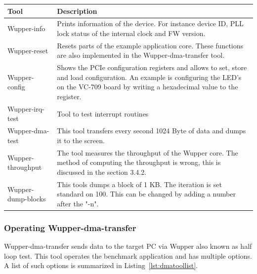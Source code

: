 \begin{center}
	\begin{tabular}{ | l || p{10cm} |}
		\hline
		Tool & Description                       \\ \hline
		
		Wupper-info
		&  Prints information of the device. For instance device ID, PLL lock status of the internal clock and FW version.
		\\ \hline
		
		Wupper-reset
		&  Resets parts of the example application core. These functions are also implemented in the Wupper-dma-transfer tool.
		\\ \hline
		
		
		Wupper-config
		& Shows the PCIe configuration registers and allows to set, store and load configuration. An example is configuring the LED's on the VC-709 board by writing a hexadecimal value to the register.
		\\ \hline
		Wupper-irq-test
		&  Tool to test interrupt routines
		\\ \hline
		
		Wupper-dma-test
		& This tool transfers every second 1024 Byte of data and dumps it to the screen.
		\\ \hline
		
		Wupper-throughput
		&  The tool measures the throughput of the Wupper core. The method of computing the throughput is wrong, this is discussed in the section 3.4.2.
		\\ \hline
		
		
		Wupper-dump-blocks
		&  This tools dumps a block of 1 KB. The iteration is set standard on 100. This can be changed by adding a number after the "-n".
		\\ \hline
		
	\end{tabular}
\end{center}

\newpage
\subsubsection{Operating Wupper-dma-transfer}

Wupper-dma-transfer sends data to the target PC via Wupper also known as half loop test. This tool operates the benchmark application and has multiple options. A list of such options is summarized in Listing~\ref{lst:dmatoollist}.

